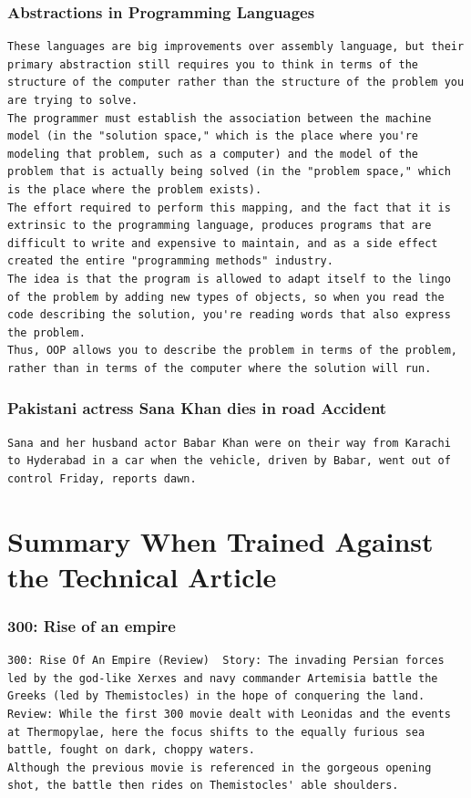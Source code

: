 \documentclass[BTech]{nitgoathesis}
\begin{document}
\subsubsection{Abstractions in Programming Languages}
\begin{lstlisting}[basicstyle=\scriptsize]
These languages are big improvements over assembly language, but their primary abstraction still requires you to think in terms of the structure of the computer rather than the structure of the problem you are trying to solve.
The programmer must establish the association between the machine model (in the "solution space," which is the place where you're modeling that problem, such as a computer) and the model of the problem that is actually being solved (in the "problem space," which is the place where the problem exists).
The effort required to perform this mapping, and the fact that it is extrinsic to the programming language, produces programs that are difficult to write and expensive to maintain, and as a side effect created the entire "programming methods" industry.
The idea is that the program is allowed to adapt itself to the lingo of the problem by adding new types of objects, so when you read the code describing the solution, you're reading words that also express the problem.
Thus, OOP allows you to describe the problem in terms of the problem, rather than in terms of the computer where the solution will run.
\end{lstlisting}
\subsubsection{Pakistani actress Sana Khan dies in road Accident}
\begin{lstlisting}[basicstyle=\scriptsize]
Sana and her husband actor Babar Khan were on their way from Karachi to Hyderabad in a car when the vehicle, driven by Babar, went out of control Friday, reports dawn.
\end{lstlisting}
\section{Summary When Trained Against the Technical Article}
\subsubsection{300: Rise of an empire}
\begin{lstlisting}[basicstyle=\scriptsize]
300: Rise Of An Empire (Review)  Story: The invading Persian forces led by the god-like Xerxes and navy commander Artemisia battle the Greeks (led by Themistocles) in the hope of conquering the land.
Review: While the first 300 movie dealt with Leonidas and the events at Thermopylae, here the focus shifts to the equally furious sea battle, fought on dark, choppy waters.
Although the previous movie is referenced in the gorgeous opening shot, the battle then rides on Themistocles' able shoulders.
\end{lstlisting}
\end{document}
